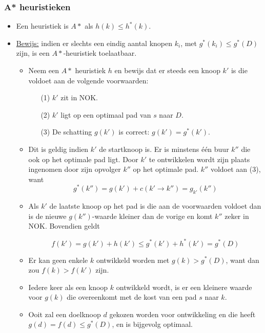 \subsubsection{A* heuristieken}
\begin{itemize}
	\item Een heuristiek is $A*$ als $h(k) \leq h^*(k)$.
	\item \underline{Bewijs:} indien er slechts een eindig aantal knopen $k_i$, met $g^*(k_i) \leq g^*(D)$ zijn, is een $A*$-heuristiek toelaatbaar.
	\begin{itemize}
		\item Neem een $A*$ heuristiek $h$ en bewijs dat er steeds een knoop $k'$ is die voldoet aan de volgende voorwaarden:
		\begin{enumerate}
			\item[(1)] $k'$ zit in NOK.
			\item[(2)] $k'$ ligt op een optimaal pad van $s$ naar $D$.
			\item[(3)] De schatting $g(k')$ is correct: $g(k') = g^*(k')$.
		\end{enumerate}
	\item Dit is geldig indien $k'$ de startknoop is. Er is minstens één buur $k''$ die ook op het optimale pad ligt. Door $k'$ te ontwikkelen wordt zijn plaats ingenomen door zijn opvolger $k''$ op het optimale pad.  $k''$ voldoet aan (3), want
	$$g^*(k'') = g(k') + c(k' \rightarrow k'') = g_{k'}(k'')$$
	\item Als $k'$ de laatste knoop op het pad is die aan de voorwaarden voldoet dan is de nieuwe $g(k'')$-waarde kleiner dan de vorige en komt $k''$ zeker in NOK. Bovendien geldt
	
	$$f(k') = g(k') + h(k') \leq g^*(k') + h^*(k') = g^*(D)$$
	
	\item Er kan geen enkele $k$ ontwikkeld worden met $g(k) > g^*(D)$, want dan zou $f(k) > f(k')$ zijn.
	\item Iedere keer als een knoop $k$ ontwikkeld wordt, is er een kleinere waarde voor $g(k)$ die overeenkomt met de kost van een pad $s$ naar $k$.
	\item Ooit zal een doelknoop $d$ gekozen worden voor ontwikkeling en die heeft $g(d) = f(d) \leq g^*(D)$, en is bijgevolg optimaal.
	\end{itemize}
\end{itemize}


